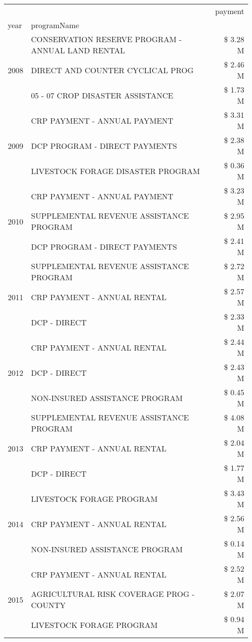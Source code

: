 \begin{tabular}{llr}
\toprule
 &  & payment \\
year & programName &  \\
\midrule
\multirow[t]{3}{*}{2008} & CONSERVATION RESERVE PROGRAM - ANNUAL LAND RENTAL & \$ 3.28 M \\
 & DIRECT AND COUNTER CYCLICAL PROG & \$ 2.46 M \\
 & 05 - 07 CROP DISASTER ASSISTANCE & \$ 1.73 M \\
\cline{1-3}
\multirow[t]{3}{*}{2009} & CRP PAYMENT - ANNUAL PAYMENT & \$ 3.31 M \\
 & DCP PROGRAM - DIRECT PAYMENTS & \$ 2.38 M \\
 & LIVESTOCK FORAGE DISASTER  PROGRAM & \$ 0.36 M \\
\cline{1-3}
\multirow[t]{3}{*}{2010} & CRP PAYMENT - ANNUAL PAYMENT & \$ 3.23 M \\
 & SUPPLEMENTAL REVENUE ASSISTANCE PROGRAM & \$ 2.95 M \\
 & DCP PROGRAM - DIRECT PAYMENTS & \$ 2.41 M \\
\cline{1-3}
\multirow[t]{3}{*}{2011} & SUPPLEMENTAL REVENUE ASSISTANCE PROGRAM & \$ 2.72 M \\
 & CRP PAYMENT - ANNUAL RENTAL & \$ 2.57 M \\
 & DCP - DIRECT & \$ 2.33 M \\
\cline{1-3}
\multirow[t]{3}{*}{2012} & CRP PAYMENT - ANNUAL RENTAL & \$ 2.44 M \\
 & DCP - DIRECT & \$ 2.43 M \\
 & NON-INSURED ASSISTANCE PROGRAM & \$ 0.45 M \\
\cline{1-3}
\multirow[t]{3}{*}{2013} & SUPPLEMENTAL REVENUE ASSISTANCE PROGRAM & \$ 4.08 M \\
 & CRP PAYMENT - ANNUAL RENTAL & \$ 2.04 M \\
 & DCP - DIRECT & \$ 1.77 M \\
\cline{1-3}
\multirow[t]{3}{*}{2014} & LIVESTOCK FORAGE PROGRAM & \$ 3.43 M \\
 & CRP PAYMENT - ANNUAL RENTAL & \$ 2.56 M \\
 & NON-INSURED ASSISTANCE PROGRAM & \$ 0.14 M \\
\cline{1-3}
\multirow[t]{3}{*}{2015} & CRP PAYMENT - ANNUAL RENTAL & \$ 2.52 M \\
 & AGRICULTURAL RISK COVERAGE PROG - COUNTY & \$ 2.07 M \\
 & LIVESTOCK FORAGE PROGRAM & \$ 0.94 M \\
\cline{1-3}

\end{tabular}
